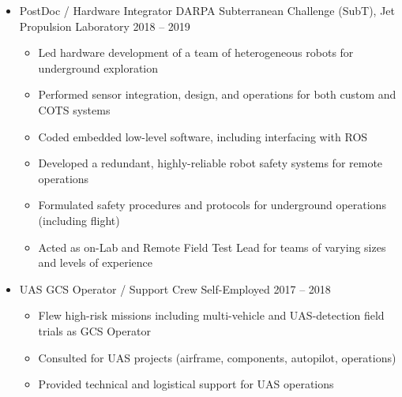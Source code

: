\documentclass[12pt,letter,sans]{moderncv}        %
\begin{document}
\begin{itemize}
\vspace{4pt}

\item{\cventry
    {}
    {PostDoc / Hardware Integrator}
    {DARPA Subterranean Challenge (SubT), Jet Propulsion Laboratory}
    {2018 -- 2019}
    {}
    {  
        \vspace{3pt} 
        \begin{itemize}
            \item Led hardware development of a team of heterogeneous robots for underground exploration
            \item Performed sensor integration, design, and operations for both custom and COTS systems
            \item Coded embedded low-level software, including interfacing with ROS 
            \item Developed a redundant, highly-reliable robot safety systems for remote operations
            \item Formulated safety procedures and protocols for underground operations (including flight) 
            \item Acted as on-Lab and Remote Field Test Lead for teams of varying sizes and levels of experience 
        \end{itemize}
    }
}

\vspace{4pt}

\item{\cventry
    {}
    {UAS GCS Operator / Support Crew}
    {Self-Employed}
    {2017 -- 2018}
    {}
    {
        \vspace{3pt} 
        \begin{itemize}
            \item Flew high-risk missions including multi-vehicle and UAS-detection field trials as GCS Operator
            \item Consulted for UAS projects (airframe, components, autopilot, operations)
            \item Provided technical and logistical support for UAS operations
        \end{itemize}
        }
    }
    
\vspace{4pt}


\end{itemize}
\end{document}

